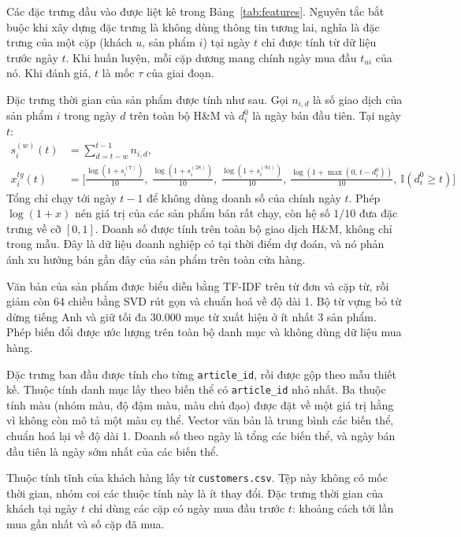 Các đặc trưng đầu vào được liệt kê trong Bảng~\ref{tab:features}. Nguyên tắc bắt buộc khi xây dựng đặc trưng là không dùng thông tin tương lai, nghĩa là đặc trưng của một cặp (khách $u$, sản phẩm $i$) tại ngày $t$ chỉ được tính từ dữ liệu trước ngày $t$. Khi huấn luyện, mỗi cặp dương mang chính ngày mua đầu $t_{ui}$ của nó. Khi đánh giá, $t$ là mốc $\tau$ của giai đoạn.

Đặc trưng thời gian của sản phẩm được tính như sau. Gọi $n_{i,d}$ là số giao dịch của sản phẩm $i$ trong ngày $d$ trên toàn bộ H\&M và $d^0_i$ là ngày bán đầu tiên. Tại ngày $t$:
\begin{equation*}
    \begin{aligned}
        s^{(w)}_i(t) &= \sum_{d = t - w}^{t - 1} n_{i,d}, \\
        x^{tg}_i(t) &= \Big[\tfrac{\log(1 + s^{(7)}_i)}{10},\ \tfrac{\log(1 + s^{(28)}_i)}{10},\ \tfrac{\log(1 + s^{(91)}_i)}{10},\ \tfrac{\log(1 + \max(0,\, t - d^0_i))}{10},\ \mathbb{I}(d^0_i \ge t)\Big]
    \end{aligned}
\end{equation*}
Tổng chỉ chạy tới ngày $t-1$ để không dùng doanh số của chính ngày $t$. Phép $\log(1+x)$ nén giá trị của các sản phẩm bán rất chạy, còn hệ số $1/10$ đưa đặc trưng về cỡ $[0, 1]$. Doanh số được tính trên toàn bộ giao dịch H\&M, không chỉ trong mẫu. Đây là dữ liệu doanh nghiệp có tại thời điểm dự đoán, và nó phản ánh xu hướng bán gần đây của sản phẩm trên toàn cửa hàng.

Văn bản của sản phẩm được biểu diễn bằng TF-IDF trên từ đơn và cặp từ, rồi giảm còn 64 chiều bằng SVD rút gọn và chuẩn hoá về độ dài 1. Bộ từ vựng bỏ từ dừng tiếng Anh và giữ tối đa 30.000 mục từ xuất hiện ở ít nhất 3 sản phẩm. Phép biến đổi được ước lượng trên toàn bộ danh mục và không dùng dữ liệu mua hàng.

Đặc trưng ban đầu được tính cho từng \texttt{article\_id}, rồi được gộp theo mẫu thiết kế. Thuộc tính danh mục lấy theo biến thể có \texttt{article\_id} nhỏ nhất. Ba thuộc tính màu (nhóm màu, độ đậm màu, màu chủ đạo) được đặt về một giá trị hằng vì không còn mô tả một màu cụ thể. Vector văn bản là trung bình các biến thể, chuẩn hoá lại về độ dài 1. Doanh số theo ngày là tổng các biến thể, và ngày bán đầu tiên là ngày sớm nhất của các biến thể.

Thuộc tính tĩnh của khách hàng lấy từ \texttt{customers.csv}. Tệp này không có mốc thời gian, nhóm coi các thuộc tính này là ít thay đổi. Đặc trưng thời gian của khách tại ngày $t$ chỉ dùng các cặp có ngày mua đầu trước $t$: khoảng cách tới lần mua gần nhất và số cặp đã mua.

